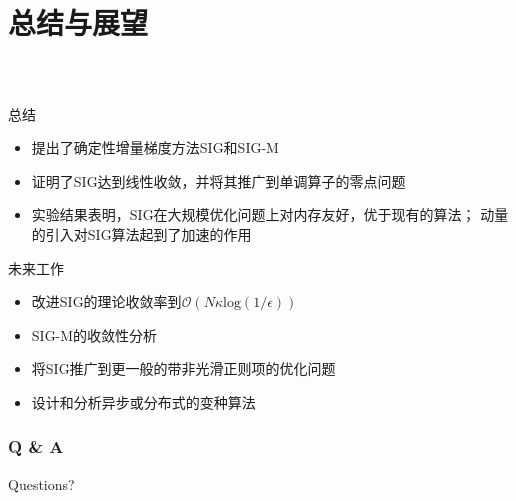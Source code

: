 \section{总结与展望}
\miniframesoff
  \frame
  {
    \frametitle{\secname~ }
    \footnotesize
    \begin{block}{总结}
    \begin{itemize}
        \item 提出了确定性增量梯度方法SIG和SIG-M
        \item 证明了SIG达到线性收敛，并将其推广到单调算子的零点问题
        \item 实验结果表明，SIG在大规模优化问题上对内存友好，优于现有的算法；
              动量的引入对SIG算法起到了加速的作用
    \end{itemize}
    \end{block}

    \pause

    \begin{block}{未来工作}
    \begin{itemize}
        \item 改进SIG的理论收敛率到$\mathcal{O}(N\kappa \text{log}(1/\epsilon))$
        \item SIG-M的收敛性分析
        \item 将SIG推广到更一般的带非光滑正则项的优化问题
        \item 设计和分析异步或分布式的变种算法
    \end{itemize}
    \end{block}
  }



  \frame
  {
    \frametitle{Q \& A}
    \begin{block}{Questions?}
      ~\\ ~\\
      \\ ~\\ ~\\ ~\\ ~\\
    \end{block}
  }
